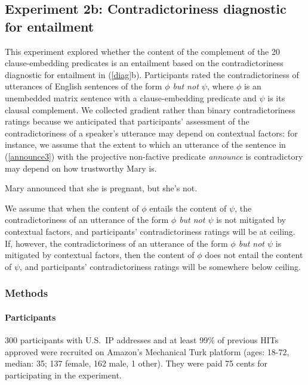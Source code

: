 \documentclass[11pt,fleqn]{article}
\newcommand{\6}{\mbox{$[\hspace*{-.6mm}[$}}
\newcommand{\9}{\mbox{$]\hspace*{-.6mm}]$}}
\begin{document}
\subsection{Experiment 2b: Contradictoriness diagnostic for entailment}\label{s32}

This experiment explored whether the content of the complement of the 20 clause-embedding predicates is an entailment based on the contradictoriness diagnostic for entailment in (\ref{diag}b). Participants rated the contradictoriness of utterances of English sentences of the form {\em $\phi$ but not $\psi$}, where $\phi$ is an unembedded matrix sentence with a clause-embedding predicate and $\psi$ is its clausal complement. We collected gradient rather than binary contradictoriness ratings because we anticipated that participants' assessment of the contradictoriness of a speaker's utterance may depend on contextual factors: for instance, we assume that the extent to which  an utterance of the sentence in (\ref{announce3}) with the projective non-factive predicate {\em announce} is contradictory may depend on how trustworthy Mary is. 

\begin{exe}
\ex\label{announce3} Mary announced that she is pregnant, but she's not.
\end{exe}
We assume that when the content of $\phi$ entails the content of $\psi$, the contradictoriness of an utterance of the form {\em $\phi$ but not $\psi$} is not mitigated by contextual factors, and participants' contradictoriness ratings will be at ceiling. If, however, the contradictoriness of an utterance of the form {\em $\phi$ but not $\psi$} is mitigated by contextual factors, then the content of $\phi$ does not entail the content of $\psi$, and participants' contradictoriness ratings will be somewhere below ceiling.

\subsubsection{Methods}

\paragraph{Participants} 300 participants with U.S.\ IP addresses and at least 99\% of previous HITs approved were recruited on Amazon's Mechanical Turk platform (ages: 18-72, median: 35; 137 female, 162 male, 1 other). They were paid 75 cents for participating in the experiment.
\end{document}
